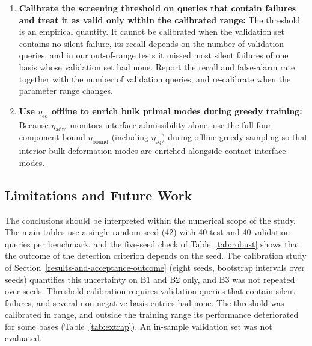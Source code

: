 \documentclass[11pt,a4paper]{article}
\begin{document}
\begin{enumerate}
\item
  \textbf{Calibrate the screening threshold on queries that contain failures and treat it as valid only within the calibrated range:}
  The threshold is an empirical quantity. It cannot be calibrated when the validation set contains no silent failure, its recall depends on the number of validation queries, and in our out-of-range tests it missed most silent failures of one basis whose validation set had none. Report the recall and false-alarm rate together with the number of validation queries, and re-calibrate when the parameter range changes.
\item
  \textbf{Use \(\eta_{\text{eq}}\) offline to enrich bulk primal modes during greedy training:}
  Because \(\eta_{\text{adm}}\) monitors interface admissibility alone, use the full four-component bound \(\eta_{\text{bound}}\) (including \(\eta_{\text{eq}}\)) during offline greedy sampling \cite{benaceur2020reduced, zhang2014duality} so that interior bulk deformation modes are enriched alongside contact interface modes.
\end{enumerate}

\hypertarget{limitations-and-future-work}{%
\subsection{Limitations and Future Work}\label{limitations-and-future-work}}

The conclusions should be interpreted within the numerical scope of the study. The main tables use a single random seed (42) with 40 test and 40 validation queries per benchmark, and the five-seed check of Table~\ref{tab:robust} shows that the outcome of the detection criterion depends on the seed. The calibration study of Section~\ref{results-and-acceptance-outcome} (eight seeds, bootstrap intervals over seeds) quantifies this uncertainty on B1 and B2 only, and B3 was not repeated over seeds. Threshold calibration requires validation queries that contain silent failures, and several non-negative basis entries had none. The threshold was calibrated in range, and outside the training range its performance deteriorated for some bases (Table~\ref{tab:extrap}). An in-sample validation set was not evaluated.
\end{document}
